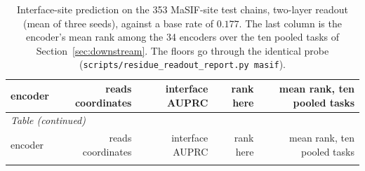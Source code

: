 \begingroup
\fontsize{7}{8.6}\selectfont
\setlength{\tabcolsep}{3pt}
\renewcommand{\arraystretch}{1.08}
\begin{longtable}{lrrrr}
\caption{Interface-site prediction on the 353 MaSIF-site test chains, two-layer readout (mean of three seeds),
against a base rate of $0.177$. The last column is the encoder's mean rank among the 34 encoders over the ten pooled
tasks of Section~\ref{sec:downstream}. The floors go through the identical probe
(\texttt{scripts/residue\_readout\_report.py masif}).}\label{tab:masif_task}\\
\toprule
\rowcolor{CompassLavender!32}
encoder & reads coordinates & interface AUPRC & rank here & mean rank, ten pooled tasks \\

\midrule
\endfirsthead
\multicolumn{5}{l}{\small\textit{Table \thetable{} (continued)}}\\
\toprule
\rowcolor{CompassLavender!32}
encoder & reads coordinates & interface AUPRC & rank here & mean rank, ten pooled tasks \\

\midrule
\endhead
\midrule
\endfoot
\bottomrule
\endlastfoot


\end{longtable}
